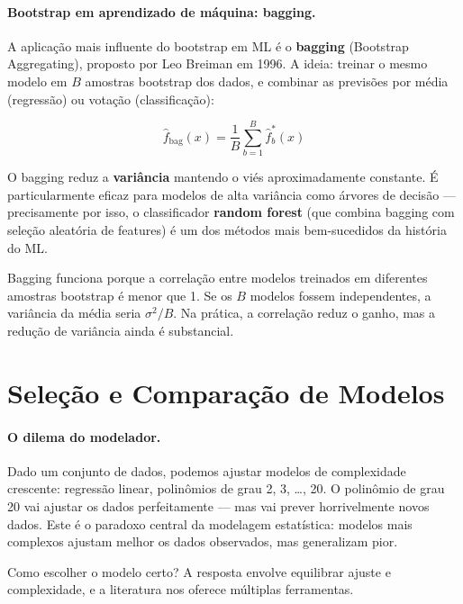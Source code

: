 \documentclass{tufte-handout}
\begin{document}
\paragraph{Bootstrap em aprendizado de máquina: bagging.}

A aplicação mais influente do bootstrap em ML é o \textbf{bagging} (Bootstrap Aggregating), proposto por Leo Breiman em 1996. A ideia: treinar o mesmo modelo em $B$ amostras bootstrap dos dados, e combinar as previsões por média (regressão) ou votação (classificação):

\[
\hat{f}_{\text{bag}}(x) = \frac{1}{B} \sum_{b=1}^B \hat{f}_b^*(x)
\]

O bagging reduz a \textbf{variância} mantendo o viés aproximadamente constante. É particularmente eficaz para modelos de alta variância como árvores de decisão --- precisamente por isso, o classificador \textbf{random forest} (que combina bagging com seleção aleatória de features) é um dos métodos mais bem-sucedidos da história do ML.

\begin{remark}
    Bagging funciona porque a correlação entre modelos treinados em diferentes amostras bootstrap é menor que 1. Se os $B$ modelos fossem independentes, a variância da média seria $\sigma^2/B$. Na prática, a correlação reduz o ganho, mas a redução de variância ainda é substancial.
\end{remark}

\section{Seleção e Comparação de Modelos}

\paragraph{O dilema do modelador.}

Dado um conjunto de dados, podemos ajustar modelos de complexidade crescente: regressão linear, polinômios de grau 2, 3, \dots, 20. O polinômio de grau 20 vai ajustar os dados perfeitamente --- mas vai prever horrivelmente novos dados. Este é o paradoxo central da modelagem estatística: modelos mais complexos ajustam melhor os dados observados, mas generalizam pior.

Como escolher o modelo certo? A resposta envolve equilibrar ajuste e complexidade, e a literatura nos oferece múltiplas ferramentas.
\end{document}

